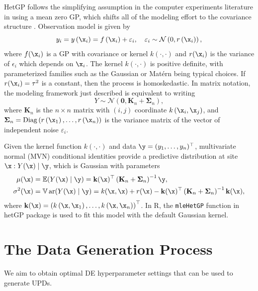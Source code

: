 \documentclass [PhD] {package/uclathes}
\begin{document}
HetGP follows the simplifying assumption in the computer experiments literature in using a mean zero GP, which shifts all of the modeling effort to the covariance structure \parencite{binois2018practical}.
Observation model is given by %
\begin{equation}
y_i = y\left(\x_i\right)=f\left(\x_i\right)+\varepsilon_i, \quad\varepsilon_i \sim \mathcal{N}\left(0, r\left(\x_i\right)\right),
\end{equation}
where $f(\x_i)$ is a GP with covariance or kernel $k(\cdot, \cdot)$ and $r(\x_i)$ is the variance of $\epsilon_i$ which depends on $\x_i$. The  kernel $k(\cdot, \cdot)$ is positive definite, with parameterized families such as the Gaussian or Mat\'ern being typical choices. If $r(\x_i)=\tau^2$ is a constant, then the process is homoskedastic.
In matrix notation, the modeling framework just described is equivalent to writing
$$
Y \sim \mathcal{N}\left(\mathbf{0}, \mathbf{K}_n+\boldsymbol{\Sigma}_n\right),
$$
where $\mathbf{K}_n$ is the $n \times n$ matrix with $(i, j)$ coordinate $k\left(\x_i, \x_j\right)$, and $\boldsymbol{\Sigma}_n=\operatorname{Diag}\left(r\left(\x_1\right), \ldots, r\left(\x_n\right)\right)$ is the variance matrix of the  vector of independent noise $\varepsilon_i$.

Given the kernel function $k(\cdot, \cdot)$ and data $\y=(y_1,\ldots,y_n)^{\top}$, multivariate normal (MVN) conditional identities provide a predictive distribution at site $\x: Y(\x) \mid \y$, which is Gaussian with parameters
$$
\begin{aligned}
\mu(\x) & =\mathbb{E}(Y(\x) \mid \y)=\mathbf{k}(\x)^{\top}\left(\mathbf{K}_n+\mathbf{\Sigma}_n\right)^{-1} \y,  \\
\sigma^2(\x) & =\mathbb{V} \operatorname{ar}(Y(\x) \mid \y)=k(\x, \x)+r(\x)-\mathbf{k}(\x)^{\top}\left(\mathbf{K}_n+\mathbf{\Sigma}_n\right)^{-1} \mathbf{k}(\x) ,
\end{aligned}
$$
where $\mathbf{k}(\x)=\left(k\left(\x, \x_1\right), \ldots, k\left(\x, \x_n\right)\right)^{\top}$.
In R, the \texttt{mleHetGP} function in hetGP package is used to fit this model with the default Gaussian kernel.


\section{The Data Generation Process}

We aim to obtain optimal DE hyperparameter settings that can be used to generate UPDs. %
\end{document}
